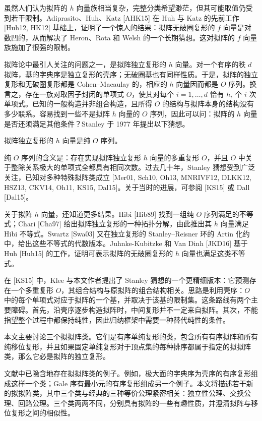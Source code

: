 虽然人们认为拟阵的 $h$ 向量族相当复杂，完整分类希望渺茫，但其可能取值仍受到若干限制。Adiprasito、Huh、Katz [AHK15] 在 Huh 与 Katz 的先前工作 [Huh12, HK12] 基础上，证明了一个惊人的结果：拟阵无破圈复形的 $f$ 向量是对数凹的，从而解决了 Heron、Rota 和 Welsh 的一个长期猜想。这对拟阵的 $f$ 向量族施加了很强的限制。

拟阵论中最引人关注的问题之一，是拟阵独立复形的 $h$ 向量。对一个有序的秩 $d$ 拟阵，基的字典序是独立复形的壳序；无破圈基也有同样性质。于是，拟阵的独立复形和无破圈复形都是 Cohen--Macaulay 的，相应的 $h$ 向量因而都是 $O$ 序列。换言之，存在一族对取因子封闭的单项式 $O$，使其对每个 $i=1,\ldots,d$ 恰有 $h_i$ 个 $i$ 次单项式。已知的一般构造并非组合构造，且所得 $O$ 的结构与拟阵本身的结构没有多少联系。容易找到一些不是拟阵 $h$ 向量的 $O$ 序列，因此可以问：拟阵的 $h$ 向量是否还须满足其他条件？Stanley 于 1977 年提出以下猜想。

拟阵独立复形的 $h$ 向量是纯 $O$ 序列。

纯 $O$ 序列的含义是：存在实现拟阵独立复形 $h$ 向量的多重复形 $O$，并且 $O$ 中关于整除关系极大的单项式全都具有相同次数。过去几十年，Stanley 猜想受到广泛关注，已知对多种特殊拟阵类成立 [Mer01, Sch10, Oh13, MNRIVF12, DLKK12, HSZ13, CKV14, Oh11, KS15, Dal15]。关于当时的进展，可参阅 [KS15] 或 Dall [Dal15]。

关于拟阵 $h$ 向量，还知道更多结果。Hibi [Hib89] 找到一组纯 $O$ 序列满足的不等式；Chari [Cha97] 给出拟阵独立复形的一种拓扑分解，由此推出其 $h$ 向量满足 Hibi 不等式。Swartz [Swa03] 又在独立复形的 Stanley--Reisner 环的 Artin 化约中，给出这些不等式的代数版本。Juhnke-Kubitzke 和 Van Dinh [JKD16] 基于 Huh [Huh15] 的工作，证明可表示拟阵的无破圈复形的 $h$ 向量也满足这类不等式。

在 [KS15] 中，Klee 与本文作者提出了 Stanley 猜想的一个更精细版本：它预测存在一个多重复形 $O$，其组合结构与原拟阵的组合结构相关。思路是利用壳序：$O$ 中的每个单项式对应于拟阵的一个基，并取决于该基的限制集。这条路线有两个主要障碍。首先，沿壳序逐步构造拟阵时，中间复形并不一定来自拟阵。其次，不能指望整个过程中都保持纯性，因此归纳框架中需要一种替代纯性的条件。

本文主要讨论三个拟拟阵类。它们是有序单纯复形的类，包含所有有序拟阵和所有纯移位复形，并且如果固定单纯复形对于顶点集的每种排序都属于指定的拟拟阵类，那么它必是拟阵的独立复形。

文献中已隐含地存在拟拟阵类的例子。例如，极大面的字典序为壳序的有序复形组成这样一个类；Gale 序有最小元的有序复形组成另一个例子。本文将描述若干新的拟拟阵类，其中三个类与经典的三种等价公理紧密相关：独立性公理、交换公理、回路公理。三个类两两不同，分别具有拟阵的一些有趣性质，并澄清拟阵与移位复形之间的相似性。

